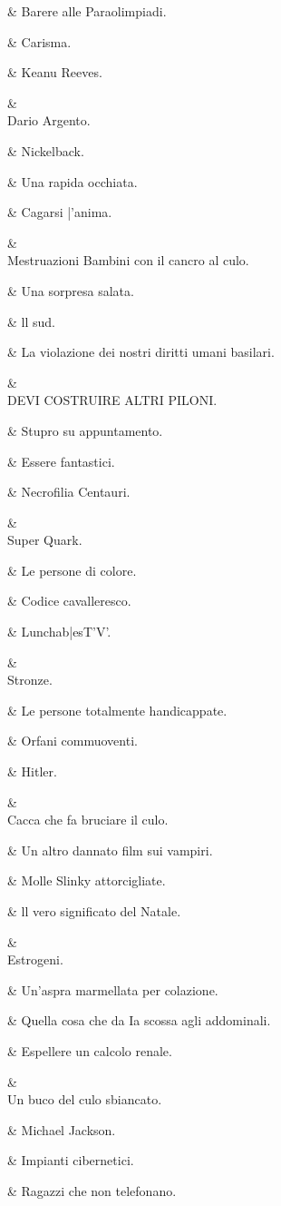 &
Barere alle
Paraolimpiadi.

&
Carisma.

&
Keanu Reeves.

&
\\
Dario Argento.

&
Nickelback.

&
Una rapida
occhiata.

&
Cagarsi |’anima.

&
\\
Mestruazioni
Bambini con il
cancro al culo.

&
Una sorpresa
salata.

&
ll sud.

&
La violazione
dei nostri diritti
umani basilari.

&
\\
DEVI
COSTRUIRE
ALTRI PILONI.

&
Stupro su
appuntamento.

&
Essere fantastici.

&
Necrofilia
Centauri.

&
\\
Super Quark.

&
Le persone di
colore.

&
Codice
cavalleresco.

&
Lunchab|esT'V'.

&
\\
Stronze.

&
Le persone
totalmente
handicappate.

&
Orfani
commuoventi.

&
Hitler.

&
\\
Cacca che fa
bruciare il culo.

&
Un altro dannato
film sui vampiri.

&
Molle Slinky
attorcigliate.

&
ll vero significato
del Natale.

&
\\
Estrogeni.

&
Un’aspra
marmellata per
colazione.

&
Quella cosa che
da Ia scossa agli
addominali.

&
Espellere un
calcolo renale.

&
\\
Un buco del culo
sbiancato.

&
Michael Jackson.

&
Impianti
cibernetici.

&
Ragazzi che non
telefonano.

